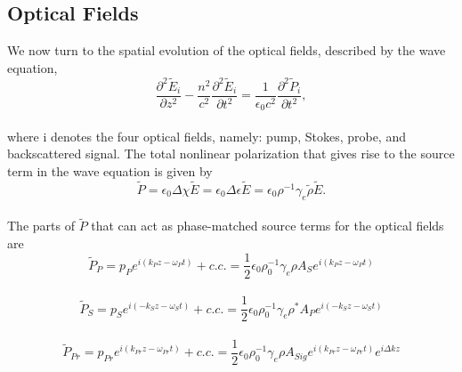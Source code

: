 \documentclass[
sn-nature,
twocolumn
]{sn-jnl}%
\begin{document}
\begin{appendices}
\subsection{Optical Fields}\label{Coupled-Wave Equations:Optical Fields}

We now turn to the spatial evolution of the optical fields, described by the wave equation,
\\
\begin{equation}
    \frac{\partial^{2}\tilde{E}_{i}}{\partial z^{2}} - \frac{n^{2}}{c^{2}}\frac{\partial^{2}\tilde{E}_{i}}{\partial t^{2}} = \frac{1}{\epsilon_{0}c^{2}}\frac{\partial^{2}\tilde{P}_{i}}{\partial t^{2}},
    \label{eq:Wave equation}
\end{equation}
\\
where i denotes the four optical fields, namely: pump, Stokes, probe, and backscattered signal. The total nonlinear polarization that gives rise to the source term in the wave equation is given by
\\
\begin{equation}
    \tilde{P} = \epsilon_{0}\Delta\chi\tilde{E} = \epsilon_{0}\Delta\epsilon\tilde{E} = \epsilon_{0}\rho^{-1}\gamma_{e}\tilde{\rho}\tilde{E}.
\end{equation}
\\
The parts of $\tilde{P}$ that can act as phase-matched source terms for the optical fields are
\\
\begin{equation}
    \tilde{P}_{P} = p_{P}e^{i(k_{P}z - \omega_{P} t)} + c.c. = \frac{1}{2}\epsilon_{0}\rho_{0}^{-1}\gamma_{e}\rho A_{S}e^{i(k_{P}z - \omega_{P} t)}
    \label{eq:Pump phase-matched source term}
\end{equation}
\\
\begin{equation}
    \tilde{P}_{S} = p_{S}e^{i(-k_{S}z - \omega_{S} t)} + c.c. = \frac{1}{2}\epsilon_{0}\rho_{0}^{-1}\gamma_{e}\rho^{*} A_{P}e^{i(-k_{S}z - \omega_{S} t)}
    \label{eq:Stokes phase-matched source term}
\end{equation}
\\
\begin{equation}
    \tilde{P}_{Pr} = p_{Pr}e^{i(k_{Pr}z - \omega_{Pr} t)} + c.c. = \frac{1}{2}\epsilon_{0}\rho_{0}^{-1}\gamma_{e}\rho A_{Sig}e^{i(k_{Pr}z - \omega_{Pr} t)}e^{i\Delta kz}
    \label{eq:Probe phase-matched source term}
\end{equation}
\\
\begin{equation}

\end{equation}
\end{appendices}
\end{document}
